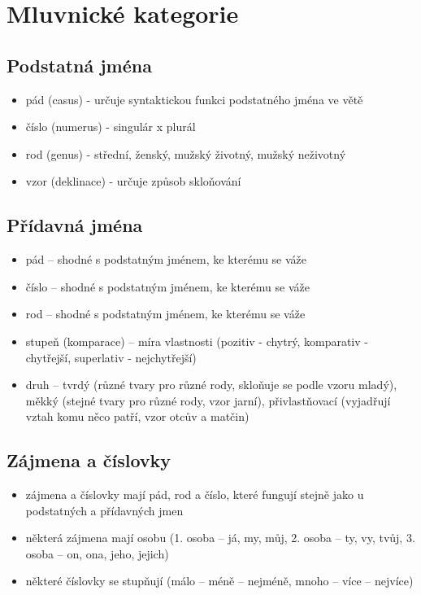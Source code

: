 \documentclass{memoir}
\begin{document}
\section*{Mluvnické kategorie}
	\subsection*{Podstatná jména}
		\begin{itemize}
			\item pád (casus) - určuje syntaktickou funkci podstatného jména ve větě
			\item číslo (numerus) - singulár x plurál
			\item rod (genus) - střední, ženský, mužský životný, mužský neživotný
			\item vzor (deklinace) - určuje způsob skloňování
		\end{itemize}
	\subsection*{Přídavná jména}
		\begin{itemize}
			\item pád -- shodné s podstatným jménem, ke kterému se váže
			\item číslo -- shodné s podstatným jménem, ke kterému se váže
			\item rod -- shodné s podstatným jménem, ke kterému se váže
			\item stupeň (komparace) -- míra vlastnosti (pozitiv - chytrý, komparativ - chytřejší, superlativ - nejchytřejší)
			\item druh -- tvrdý (různé tvary pro různé rody, skloňuje se podle vzoru mladý), měkký (stejné tvary pro různé rody, vzor jarní), přivlastňovací (vyjadřují vztah komu něco patří, vzor otcův a matčin)
		\end{itemize}
	\subsection*{Zájmena a číslovky}
		\begin{itemize}
			\item zájmena a číslovky mají pád, rod a číslo, které fungují stejně jako u podstatných a přídavných jmen
			\item některá zájmena mají osobu (1. osoba -- já, my, můj, 2. osoba -- ty, vy, tvůj, 3. osoba -- on, ona, jeho, jejich)
			\item některé číslovky se stupňují (málo -- méně -- nejméně, mnoho -- více -- nejvíce)
		\end{itemize}
\end{document}
